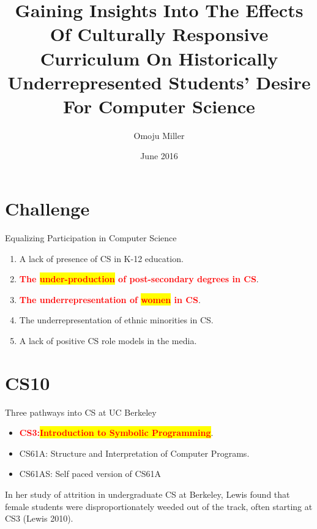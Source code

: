 \documentclass{beamer}                  %
\title[Culturally Responsive CS]{Gaining Insights Into The Effects Of Culturally Responsive Curriculum On Historically Underrepresented Students’ Desire For Computer Science}
\author[@omojumiller]{Omoju Miller}
\institute[UC Berkeley]{University of California, Berkeley }
\date{June 2016}
\newcommand{\hilight}[1]{\colorbox{yellow}{#1}}
\begin{document}
\section{}
        \begin{frame}[plain]
            \titlepage 
        \end{frame}

\section{Challenge}
  \begin{frame}{}
    \begin{center}
      {\LARGE Equalizing Participation in Computer Science}
      \begin{enumerate}
                \item A lack of presence of CS in K-12 education.
                \item \textcolor{red}{\textbf{The \hilight{under-production} of post-secondary degrees in CS}}. 
                \item \textcolor{red}{\textbf{The underrepresentation of \hilight{women} in CS}}.
                \item The underrepresentation of ethnic minorities in CS.
                \item A lack of positive CS role models in the media. 
                
      \end{enumerate}
    \end{center}
  \end{frame}

\section{CS10}
        \begin{frame}{}
        Three pathways into CS at UC Berkeley
            \begin{itemize}
                \item \textcolor{red}{\textbf{CS3:\hilight{Introduction to Symbolic Programming}}}.
                \item CS61A: Structure and Interpretation of Computer Programs.
                \item CS61AS: Self paced version of CS61A
            \end{itemize}
        \end{frame}

        \begin{frame}{}
        In her study of attrition in undergraduate CS at Berkeley, Lewis found that female students were disproportionately weeded out of the track, often starting at CS3 (Lewis 2010).
        \end{frame}
\end{document}
